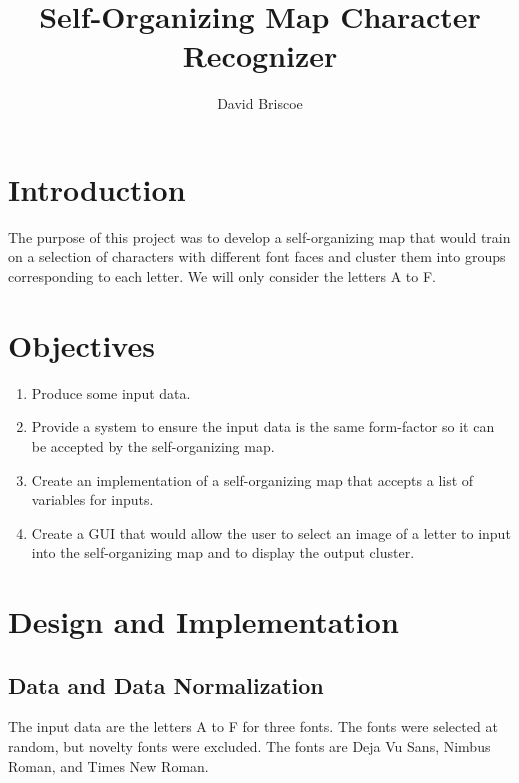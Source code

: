 \documentclass[12pt,letterpaper,oneside]{report}
\title{Self-Organizing Map Character Recognizer}
\author{ David Briscoe }
\begin{document}
\setcounter{page}{1}
\maketitle
\tableofcontents
\clearpage

\setcounter{section}{0}
\setcounter{page}{1}



\section{Introduction}
The purpose of this project was to develop a self-organizing map that would train on a selection of characters with different font faces and cluster them into groups corresponding to each letter. We will only consider the letters A to F.

\section{Objectives}

\begin{enumerate}
\item Produce some input data.
\item Provide a system to ensure the input data is the same form-factor so it can be accepted by the self-organizing map.
\item Create an implementation of a self-organizing map that accepts a list of variables for inputs.
\item Create a GUI that would allow the user to select an image of a letter to input into the self-organizing map and to display the output cluster.
\end{enumerate}

\clearpage
\section{Design and Implementation}
\subsection{Data and Data Normalization}
The input data are the letters A to F for three fonts. The fonts were selected at random, but novelty fonts were excluded. The fonts are Deja Vu Sans, Nimbus Roman, and Times New Roman. 
\end{document}
